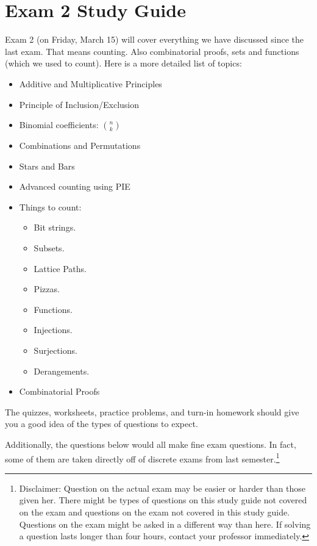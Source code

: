 \section{Exam 2 Study Guide}

Exam 2 (on Friday, March 15) will cover everything we have discussed since the last exam.  That means counting.  Also combinatorial proofs, sets and functions (which we used to count). Here is a more detailed list of topics:

\begin{itemize}
 \item Additive and Multiplicative Principles
 \item Principle of Inclusion/Exclusion
 \item Binomial coefficients: ${n \choose k}$
 \item Combinations and Permutations
 \item Stars and Bars
 \item Advanced counting using PIE
 \item Things to count:
 \begin{itemize}
 	\item Bit strings.
 	\item Subsets.
 	\item Lattice Paths.
 	\item Pizzas.
 	\item Functions.
 	\item Injections.
 	\item Surjections.
 	\item Derangements.
 \end{itemize}
 \item Combinatorial Proofs
\end{itemize}


The quizzes, worksheets, practice problems, and turn-in homework should give you a good idea of the types of questions to expect.  

Additionally, the questions below would all make fine exam questions.  In fact, some of them are taken directly off of discrete exams from last semester.\footnote{Disclaimer: Question on the actual exam may be easier or harder than those given her.  There might be types of questions on this study guide not covered on the exam and questions on the exam not covered in this study guide.  Questions on the exam might be asked in a different way than here.  If solving a question lasts longer than four hours, contact your professor immediately.}  




